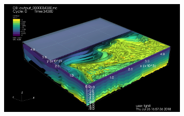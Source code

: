 \documentclass[11pt]{article}
\begin{document}
\clearpage
\begin{figure}[h!]
\centering
\begin{subfigure}{0.99\linewidth}
\includegraphics[width=\linewidth]{solarForcing/solarforcing-constantT}
\end{subfigure}


\end{figure}
\end{document}
